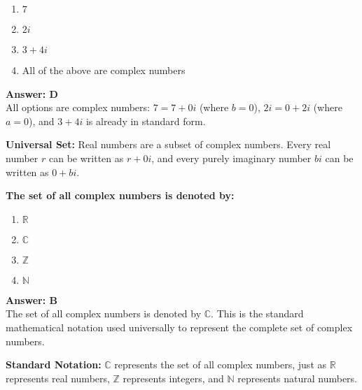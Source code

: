 \documentclass[12pt,a4paper]{article}
\begin{document}
\begin{partbox}[Options]
\begin{enumerate}[label=\Alph*.]
    \item \( 7 \)
    \item \( 2i \)
    \item \( 3 + 4i \)
    \item All of the above are complex numbers
\end{enumerate}
\end{partbox}

\begin{answerstyle}
\textbf{Answer: D} \\
All options are complex numbers: \( 7 = 7 + 0i \) (where \( b = 0 \)), \( 2i = 0 + 2i \) (where \( a = 0 \)), and \( 3 + 4i \) is already in standard form.
\end{answerstyle}

\begin{conceptbox}
\textbf{Universal Set:} Real numbers are a subset of complex numbers. Every real number \( r \) can be written as \( r + 0i \), and every purely imaginary number \( bi \) can be written as \( 0 + bi \).
\end{conceptbox}

\newpage

\begin{questiontitle}[MCQ 10]
\textbf{The set of all complex numbers is denoted by:}
\end{questiontitle}

\begin{partbox}[Options]
\begin{enumerate}[label=\Alph*.]
    \item \( \mathbb{R} \)
    \item \( \mathbb{C} \)
    \item \( \mathbb{Z} \)
    \item \( \mathbb{N} \)
\end{enumerate}
\end{partbox}

\begin{answerstyle}
\textbf{Answer: B} \\
The set of all complex numbers is denoted by \( \mathbb{C} \). This is the standard mathematical notation used universally to represent the complete set of complex numbers.
\end{answerstyle}

\begin{conceptbox}
\textbf{Standard Notation:} \( \mathbb{C} \) represents the set of all complex numbers, just as \( \mathbb{R} \) represents real numbers, \( \mathbb{Z} \) represents integers, and \( \mathbb{N} \) represents natural numbers.
\end{conceptbox}
\end{document}
